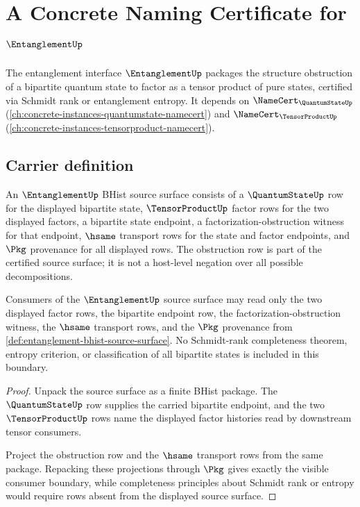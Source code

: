 \chapter{A Concrete Naming Certificate for $\EntanglementUp$}
\label{ch:concrete-instances-entanglement-namecert}

The entanglement interface $\EntanglementUp$ packages the structure obstruction of a bipartite quantum state to factor as a tensor product of pure states, certified via Schmidt rank or entanglement entropy. It depends on $\NameCert_{\QuantumStateUp}$ (\autoref{ch:concrete-instances-quantumstate-namecert}) and $\NameCert_{\TensorProductUp}$ (\autoref{ch:concrete-instances-tensorproduct-namecert}).

\section{Carrier definition}
\label{sec:entanglement-carrier}

\begin{definition}
\label{def:entanglement-bhist-source-surface}
An $\EntanglementUp$ BHist source surface consists of a $\QuantumStateUp$ row
for the displayed bipartite state, $\TensorProductUp$ factor rows for the two
displayed factors, a bipartite state endpoint, a factorization-obstruction
witness for that endpoint, $\hsame$ transport rows for the state and factor
endpoints, and $\Pkg$ provenance for all displayed rows. The obstruction row is
part of the certified source surface; it is not a host-level negation over all
possible decompositions.
\end{definition}

\begin{theorem}
\label{thm:entanglement-source-factor-boundary}
Consumers of the $\EntanglementUp$ source surface may read only the two
displayed factor rows, the bipartite endpoint row, the
factorization-obstruction witness, the $\hsame$ transport rows, and the
$\Pkg$ provenance from \autoref{def:entanglement-bhist-source-surface}. No
Schmidt-rank completeness theorem, entropy criterion, or classification of all
bipartite states is included in this boundary.
\end{theorem}
\begin{proof}
Unpack the source surface as a finite BHist package. The $\QuantumStateUp$ row
supplies the carried bipartite endpoint, and the two $\TensorProductUp$ rows
name the displayed factor histories read by downstream tensor consumers.

Project the obstruction row and the $\hsame$ transport rows from the same
package. Repacking these projections through $\Pkg$ gives exactly the visible
consumer boundary, while completeness principles about Schmidt rank or entropy
would require rows absent from the displayed source surface.
\end{proof}

